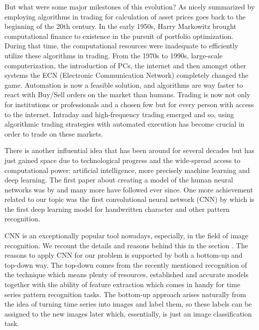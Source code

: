 \documentclass[12pt, a4paper]{article}
\begin{document}
But what were some major milestones of this evolution? As nicely summarized by \cite{rialtohistory}  employing algorithms in trading for calculation of asset prices goes back to the beginning of the 20th century. In the early 1950s, Harry Markowitz brought computational finance to existence in the pursuit of portfolio optimization. During that time, the computational 
resources were inadequate to efficiently utilize these algorithms in trading. From the 1970s to 1990s, 
large-scale computerization, the introduction of PCs, the internet and then amongst other systems the ECN (Electronic Communication Network) completely changed the game. Automation is now a feasible solution, and algorithms are way faster to react with Buy/Sell orders on the market than humans. Trading is now not only for institutions or professionals and a chosen few but for every person with access to the internet. 
Intraday and high-frequency trading emerged and so, using algorithmic trading strategies with automated execution has become crucial in order to 
trade on these markets. 

There is another influential idea that has been around for several decades but has just gained space due to technological progress and the wide-spread access to computational power: artificial intelligence, more 
precisely machine learning and deep learning. 
The first paper about creating a model of the human neural networks was by \cite{mcculloch1943logical} and many more have followed ever since. 
One more achievement related to our topic was the first convolutional neural network (CNN) by \cite{fukushima1979neural} which is the first deep learning model for handwritten character and other 
pattern recognition.

CNN is an exceptionally popular tool nowadays, especially, in the field of image recognition. We recount the details and reasons behind this in the section .
The reasons to apply CNN for our problem is supported by both a bottom-up and top-down way. The top-down comes from the recently mentioned recognition of the technique which 
means plenty of resources, established and accurate models together with the ability of feature extraction which comes in handy for time series pattern recognition tasks. 
The bottom-up approach arises naturally from the idea of turning time series into images and label them, so these labels can be assigned to the new images later which, essentially, is 
just an image classification task. 
\end{document}
